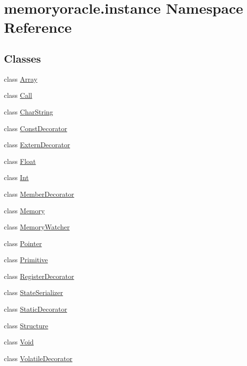 \hypertarget{namespacememoryoracle_1_1instance}{}\section{memoryoracle.\+instance Namespace Reference}
\label{namespacememoryoracle_1_1instance}
\subsection*{Classes}
\begin{DoxyCompactItemize}
\item 
class \hyperlink{classmemoryoracle_1_1instance_1_1Array}{Array}
\item 
class \hyperlink{classmemoryoracle_1_1instance_1_1Call}{Call}
\item 
class \hyperlink{classmemoryoracle_1_1instance_1_1CharString}{Char\+String}
\item 
class \hyperlink{classmemoryoracle_1_1instance_1_1ConstDecorator}{Const\+Decorator}
\item 
class \hyperlink{classmemoryoracle_1_1instance_1_1ExternDecorator}{Extern\+Decorator}
\item 
class \hyperlink{classmemoryoracle_1_1instance_1_1Float}{Float}
\item 
class \hyperlink{classmemoryoracle_1_1instance_1_1Int}{Int}
\item 
class \hyperlink{classmemoryoracle_1_1instance_1_1MemberDecorator}{Member\+Decorator}
\item 
class \hyperlink{classmemoryoracle_1_1instance_1_1Memory}{Memory}
\item 
class \hyperlink{classmemoryoracle_1_1instance_1_1MemoryWatcher}{Memory\+Watcher}
\item 
class \hyperlink{classmemoryoracle_1_1instance_1_1Pointer}{Pointer}
\item 
class \hyperlink{classmemoryoracle_1_1instance_1_1Primitive}{Primitive}
\item 
class \hyperlink{classmemoryoracle_1_1instance_1_1RegisterDecorator}{Register\+Decorator}
\item 
class \hyperlink{classmemoryoracle_1_1instance_1_1StateSerializer}{State\+Serializer}
\item 
class \hyperlink{classmemoryoracle_1_1instance_1_1StaticDecorator}{Static\+Decorator}
\item 
class \hyperlink{classmemoryoracle_1_1instance_1_1Structure}{Structure}
\item 
class \hyperlink{classmemoryoracle_1_1instance_1_1Void}{Void}
\item 
class \hyperlink{classmemoryoracle_1_1instance_1_1VolatileDecorator}{Volatile\+Decorator}
\end{DoxyCompactItemize}
